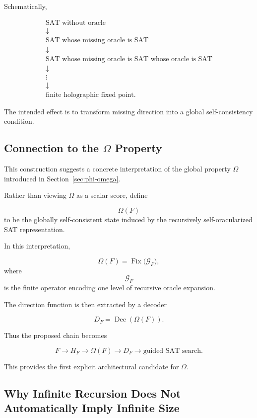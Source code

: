 \documentclass[11pt]{article}
\theoremstyle{plain}
\theoremstyle{definition}
\begin{document}
Schematically,

\[
\boxed{
\begin{array}{c}
\text{SAT without oracle}\\[3pt]
\downarrow\\[3pt]
\text{SAT whose missing oracle is SAT}\\[3pt]
\downarrow\\[3pt]
\text{SAT whose missing oracle is SAT whose oracle is SAT}\\[3pt]
\downarrow\\[3pt]
\vdots\\[3pt]
\downarrow\\[3pt]
\text{finite holographic fixed point}.
\end{array}
}
\]

The intended effect is to transform missing direction into a global
self-consistency condition.

\subsection{Connection to the \(\Omega\) Property}

This construction suggests a concrete interpretation of the global property
\(\Omega\) introduced in Section~\ref{sec:phi-omega}.

Rather than viewing \(\Omega\) as a scalar score, define

\[
    \Omega(F)
\]
to be the globally self-consistent state induced by the recursively
self-oracularized SAT representation.

In this interpretation,

\[
    \Omega(F)
    =
    \operatorname{Fix}
    \bigl(
        \mathcal{G}_F
    \bigr),
\]
where
\[
    \mathcal{G}_F
\]
is the finite operator encoding one level of recursive oracle expansion.

The direction function is then extracted by a decoder

\[
    D_F
    =
    \operatorname{Dec}(\Omega(F)).
\]

Thus the proposed chain becomes

\[
\boxed{
F
\longrightarrow
H_F
\longrightarrow
\Omega(F)
\longrightarrow
D_F
\longrightarrow
\text{guided SAT search}.
}
\]

This provides the first explicit architectural candidate for \(\Omega\).

\subsection{Why Infinite Recursion Does Not Automatically Imply Infinite Size}
\end{document}

